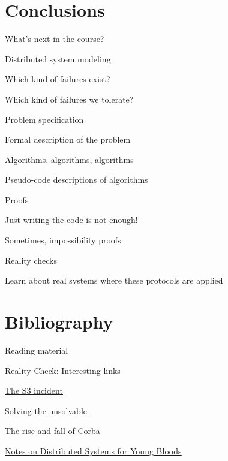 \section{Conclusions}

\begin{frame}{What's next in the course?}
\BI
\item Distributed system modeling
\BI
\item Which kind of failures exist? 
\item Which kind of failures we tolerate?
\EI
\bigskip
\item Problem specification
\BI
\item Formal description of the problem
\EI
\item Algorithms, algorithms, algorithms
\BI
\item Pseudo-code descriptions of algorithms
\EI
\bigskip
\item Proofs
\BI
\item Just writing the code is not enough!
\item Sometimes, impossibility proofs
\EI
\bigskip
\item Reality checks
\BI
\item Learn about real systems where these protocols are applied
\EI
\EI
\end{frame}


\section{Bibliography}

\begin{frame}{Reading material}

{\footnotesize

  
}

\end{frame}


\begin{frame}{Reality Check: Interesting links}

\BI
\item \href{http://status.aws.amazon.com/s3-20080720.html}{\underline{The S3 incident}}
\item \href{http://cacm.acm.org/magazines/2011/7/109895-solving-the-unsolvable/fulltext}{\underline{Solving the unsolvable}}
\item \href{http://queue.acm.org/detail.cfm?id=1142044}{\underline{The rise and fall of Corba}}
\item \href{https://www.somethingsimilar.com/2013/01/14/notes-on-distributed-systems-for-young-bloods/}{\underline{Notes on Distributed Systems for Young Bloods}}
\EI

\end{frame}



 

